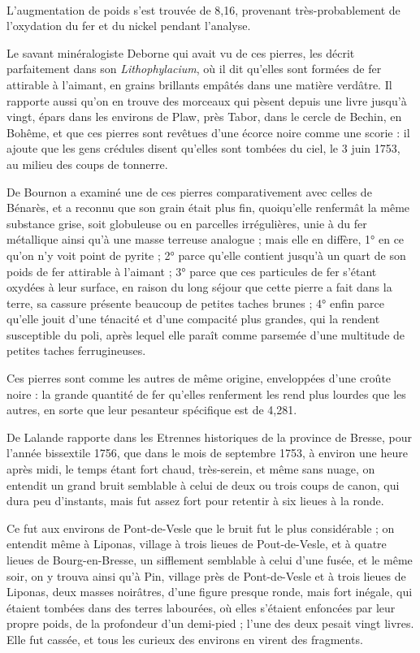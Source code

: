 \documentclass[a4paper, 12pt, oneside, french]{article}
\begin{document}
\paragraph{}
L'augmentation de poids s'est trouvée de 8,16, provenant très-probablement de l'oxydation du fer et du nickel pendant l'analyse.

Le savant minéralogiste Deborne qui avait vu de ces pierres, les décrit parfaitement dans son \emph{Lithophylacium}, où il dit qu'elles sont formées de fer attirable à l'aimant, en grains brillants empâtés dans une matière verdâtre. Il rapporte aussi qu'on en trouve des morceaux qui pèsent depuis une livre jusqu'à vingt, épars dans les environs de Plaw, près Tabor, dans le cercle de Bechin, en Bohême, et que ces pierres sont revêtues d'une écorce noire comme une scorie : il ajoute que les gens crédules disent qu'elles sont tombées du ciel, le 3 juin 1753, au milieu des coups de tonnerre.

De Bournon a examiné une de ces pierres comparativement avec celles de Bénarès, et a reconnu que son grain était plus fin, quoiqu'elle renfermât la même substance grise, soit globuleuse ou en parcelles irrégulières, unie à du fer métallique ainsi qu'à une masse terreuse analogue ; mais elle en diffère, 1° en ce qu'on n'y voit point de pyrite ; 2° parce qu'elle contient jusqu'à un quart de son poids de fer attirable à l'aimant ; 3° parce que ces particules de fer s'étant oxydées à leur surface, en raison du long séjour que cette pierre a fait dans la terre, sa cassure présente beaucoup de petites taches brunes ; 4° enfin parce qu'elle jouit d'une ténacité et d'une compacité plus grandes, qui la rendent susceptible du poli, après lequel elle paraît comme parsemée d'une multitude de petites taches ferrugineuses.

Ces pierres sont comme les autres de même origine, enveloppées d'une croûte noire : la grande quantité de fer qu'elles renferment les rend plus lourdes que les autres, en sorte que leur pesanteur spécifique est de 4,281.

De Lalande rapporte dans les Etrennes historiques de la province de Bresse, pour l'année bissextile 1756, que dans le mois de septembre 1753, à environ une heure après midi, le temps étant fort chaud, très-serein, et même sans nuage, on entendit un grand bruit semblable à celui de deux ou trois coups de canon, qui dura peu d'instants, mais fut assez fort pour retentir à six lieues à la ronde.

Ce fut aux environs de Pont-de-Vesle que le bruit fut le plus considérable ; on entendit même à Liponas, village à trois lieues de Pout-de-Vesle, et à quatre lieues de Bourg-en-Bresse, un sifflement semblable à celui d'une fusée, et le même soir, on y trouva ainsi qu'à Pin, village près de Pont-de-Vesle et à trois lieues de Liponas, deux masses noirâtres, d'une figure presque ronde, mais fort inégale, qui étaient tombées dans des terres labourées, où elles s'étaient enfoncées par leur propre poids, de la profondeur d'un demi-pied ; l'une des deux pesait vingt livres. Elle fut cassée, et tous les curieux des environs en virent des fragments.
\end{document}
